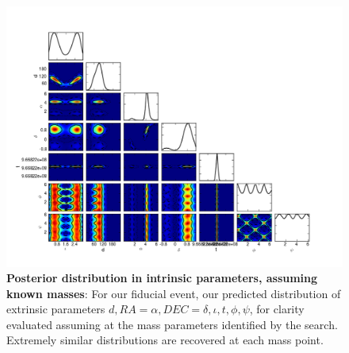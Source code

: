 \begin{figure}
\includegraphics[width=\textwidth]{../Figures/v2runs_coinc_id_833_ILE_triplot_MASS_SET_0}
\caption{\label{fig:FiducialEvent:Triplot:TriggerMasses}\textbf{Posterior distribution in intrinsic parameters, assuming known masses}: For our fiducial event, our predicted
  distribution of extrinsic parameters $d,RA=\alpha,DEC=\delta,\iota,t,\phi,\psi$, for clarity evaluated assuming at the
  mass parameters identified by the search.  Extremely similar distributions are recovered at each mass point. 
}
\end{figure}


